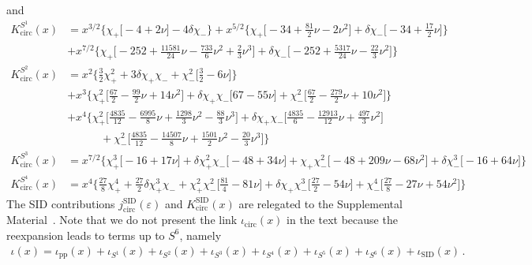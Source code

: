 \documentclass[prd,superscriptaddress,preprintnumbers,tightenlines,nofootinbib, eqsecnum]{revtex4-2}
\newcommand{\nn}{\nonumber}
\begin{document}
and
\begin{subequations}
    \begin{align}
K_{\text{circ}}^{S^1}(x) &= x^{3/2}\Bigg\{\chi_{+}\Bigg[-4 + 2 \nu\Bigg] - 4 \delta\chi_{-}\Bigg\} + x^{5/2}\Bigg\{\chi_{+}\Bigg[-34 + \frac{81}{2} \nu - 2 \nu^{2}\Bigg] + \delta\chi_{-}\Bigg[-34 + \frac{17}{2} \nu\Bigg]\Bigg\} \nn \\
& + x^{7/2}\Bigg\{\chi_{+}\Bigg[-252 + \frac{11581}{24} \nu - \frac{733}{6} \nu^{2} + \frac{2}{3} \nu^{3}\Bigg] + \delta\chi_{-}\Bigg[-252 + \frac{5317}{24} \nu - \frac{22}{3} \nu^{2}\Bigg]\Bigg\} \\
K_{\text{circ}}^{S^2}(x) &= x^{2}\Bigg\{\frac{3}{2}\chi_{+}^2 + 3 \delta\chi_{+}\chi_{-} + \chi_{-}^2\Bigg[\frac{3}{2} - 6 \nu\Bigg]\Bigg\} \nn \\
&+ x^{3}\Bigg\{\chi_{+}^2\Bigg[\frac{67}{2} - \frac{99}{2} \nu + 14 \nu^{2}\Bigg] + \delta\chi_{+}\chi_{-}\Bigg[67 - 55 \nu\Bigg] + \chi_{-}^2\Bigg[\frac{67}{2} - \frac{279}{2} \nu + 10 \nu^{2}\Bigg]\Bigg\} \nn \\
& + x^{4}\Bigg\{\chi_{+}^2\Bigg[\frac{4835}{12} - \frac{6995}{8} \nu + \frac{1298}{3} \nu^{2} - \frac{88}{3} \nu^{3}\Bigg]  + \delta\chi_{+}\chi_{-}\Bigg[\frac{4835}{6} - \frac{12913}{12} \nu + \frac{497}{3} \nu^{2}\Bigg] \nn\\
& \qquad\quad  + \chi_{-}^2\Bigg[\frac{4835}{12} - \frac{14507}{8} \nu + \frac{1501}{2} \nu^{2} - \frac{20}{3} \nu^{3}\Bigg]\Bigg\}
\\
K_{\text{circ}}^{S^3}(x) &= x^{7/2}\Bigg\{\chi_{+}^3\Bigg[-16 + 17 \nu\Bigg] + \delta\chi_{+}^2\chi_{-}\Bigg[-48 + 34 \nu\Bigg] + \chi_{+}\chi_{-}^2\Bigg[-48 + 209 \nu - 68 \nu^{2}\Bigg] + \delta\chi_{-}^3\Bigg[-16 + 64 \nu\Bigg]\Bigg\}
\\
K_{\text{circ}}^{S^4}(x) &= x^{4}\Bigg\{\frac{27}{8}\chi_{+}^4 + \frac{27}{2} \delta\chi_{+}^3\chi_{-} + \chi_{+}^2\chi_{-}^2\Bigg[\frac{81}{4} - 81 \nu\Bigg] + \delta\chi_{+}\chi_{-}^3\Bigg[\frac{27}{2} - 54 \nu\Bigg] + \chi_{-}^4\Bigg[\frac{27}{8} - 27 \nu + 54 \nu^{2}\Bigg]\Bigg\}
\end{align}
\end{subequations}
%
The SID contributions  $j_{\text{circ}}^{\text{SID}}(\varepsilon)$ and $K_{\text{circ}}^{\text{SID}}(x)$ are relegated to the Supplemental Material~\cite{Supplemental}.
Note that we do not present the link $\iota_\text{circ}(x)$ in the text because the reexpansion leads to terms up to $S^6$, namely
\begin{align}
    \iota(x) = \iota_\text{pp}(x)+ \iota_{S^1}(x)+ \iota_{S^2}(x)+ \iota_{S^3}(x)+ \iota_{S^4}(x)+ \iota_{S^5}(x)+ \iota_{S^6}(x)+ \iota_\text{SID}(x) \,.
\end{align}
\end{document}
